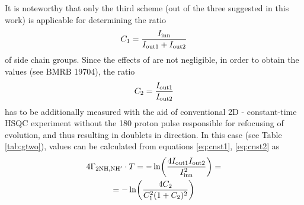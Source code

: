 \documentclass[twocolumn]{svjour3}           %
\begin{document}
It is noteworthy that only the third scheme (out of the three suggested 
in this work) is applicable for determining the ratio
\begin{equation}
    \label{eq:cnst1}
    C_1 = \frac{I_\textrm{inn}}{I_\textrm{out1} + I_\textrm{out2}}
\end{equation}
of side chain \NHtwo{} groups. Since the effects of \gtwoNNH{}
are not negligible, in order to obtain the \gtwoNH{} values 
(see BMRB 19704), the ratio
\begin{equation}
    \label{eq:cnst2}
    C_2 = \frac{I_\textrm{out1}}{I_\textrm{out2}}
\end{equation}
has to be additionally measured with the aid of conventional 2D 
\hlab-\nlab{} constant-time {HSQC} experiment without the 180\degree{} 
proton pulse responsible for refocusing of \oneJnh{} evolution, 
and thus resulting in doublets in \nlab{} direction. In this case 
(see Table 
\ref{tab:gtwo}), \gtwoNH{} values can be calculated from equations \eqref{eq:cnst1}, \eqref{eq:cnst2} as
\begin{multline}
    \label{eq:gtwoNH2}
    4\Gamma_{\text{2NH,NH}'}\cdot T = 
    -\ln \biggl( \frac{4 I_\textrm{out1}I_\textrm{out2}}{I_\textrm{inn}^2} \biggr)= \\
    = -\ln \biggl( \frac{4 C_2}{C_1^2 (1+C_2)^2} \biggr)
\end{multline}
\end{document}
